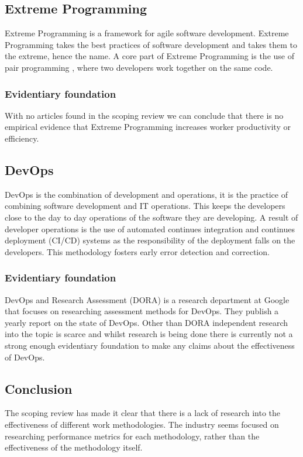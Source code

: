 \documentclass[12pt]{article}
\begin{document}
\subsection{Extreme Programming}
Extreme Programming \cite{ExtremeProgramming2025} is a framework for agile software development. Extreme Programming takes 
the best practices of software development and takes them to the extreme, hence the name. A core part of Extreme Programming is the use of
pair programming \cite{PairProgramming2024}, where two developers work together on the same code.

\subsubsection{Evidentiary foundation}
With no articles found in the scoping review we can conclude that there is no empirical evidence that Extreme Programming increases worker productivity or efficiency.

\subsection{DevOps}
DevOps is the combination of development and operations, it is the practice of combining software development and IT operations.
This keeps the developers close to the day to day operations of the software they are developing. A result of developer operations is 
the use of automated continues integration and continues deployment (CI/CD) \cite{ContinuousDelivery2025} systems as the responsibility 
of the deployment falls on the developers. This methodology fosters early error detection and correction.

\subsubsection{Evidentiary foundation}
DevOps and Research Assessment (DORA) \cite{DORAGetBetter} is a research department at Google that focuses on 
researching assessment methods for DevOps. They publish a yearly report on the state of DevOps. Other than DORA independent research
into the topic is scarce and whilst research is being done there is currently not a strong enough evidentiary foundation to make 
any claims about the effectiveness of DevOps.

\subsection{Conclusion}
The scoping review has made it clear that there is a lack of research into the effectiveness of different work methodologies.
The industry seems focused on researching performance metrics for each methodology, rather than the 
effectiveness of the methodology itself.
\end{document}
